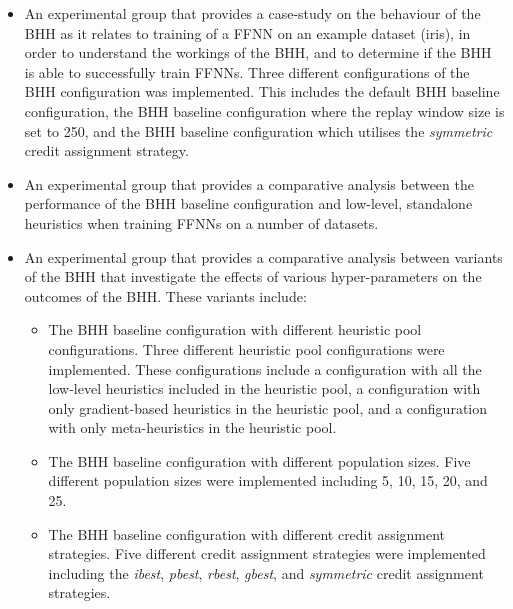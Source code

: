 \begin{itemize}
      \item An experimental group that provides a case-study on the behaviour of the \ac{BHH} as it relates to training of a \acs{FFNN} on an example dataset (iris), in order to understand the workings of the \acs{BHH}, and to determine if the \acs{BHH} is able to successfully train \acp{FFNN}. Three different configurations of the \acs{BHH} configuration was implemented. This includes the default \acs{BHH} baseline configuration, the \acs{BHH} baseline configuration where the replay window size is set to 250, and the \acs{BHH} baseline configuration which utilises the \textit{symmetric} credit assignment strategy.

      \item An experimental group that provides a comparative analysis between the performance of the \acs{BHH} baseline configuration and low-level, standalone heuristics when training \acp{FFNN} on a number of datasets.

      \item An experimental group that provides a comparative analysis between variants of the \ac{BHH} that investigate the effects of various hyper-parameters on the outcomes of the \acs{BHH}. These variants include:

            \begin{itemize}
                  \item The \acs{BHH} baseline configuration with different heuristic pool configurations. Three different heuristic pool configurations were implemented. These configurations include a configuration with all the low-level heuristics included in the heuristic pool, a configuration with only gradient-based heuristics in the heuristic pool, and a configuration with only meta-heuristics in the heuristic pool.

                  \item The \acs{BHH} baseline configuration with different population sizes. Five different population sizes were implemented including 5, 10, 15, 20, and 25.

                  \item The \acs{BHH} baseline configuration with different credit assignment strategies. Five different credit assignment strategies were implemented including the \textit{ibest}, \textit{pbest}, \textit{rbest}, \textit{gbest}, and \textit{symmetric} credit assignment strategies.


\end{itemize}
\end{itemize}
